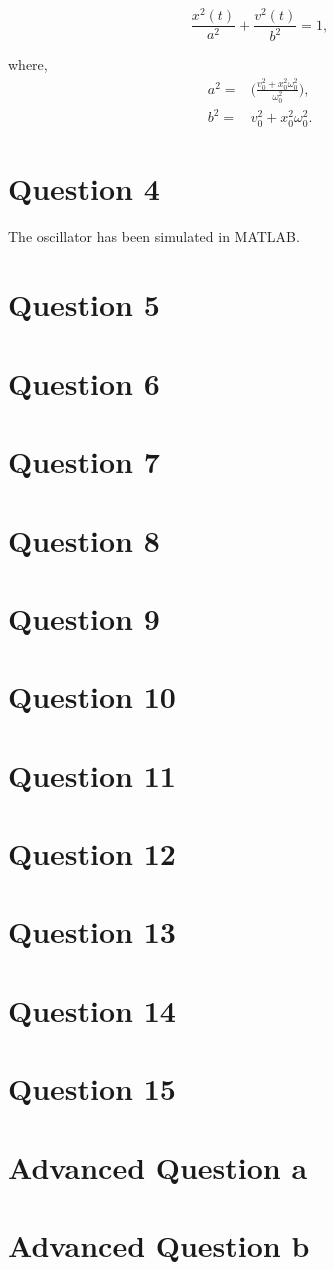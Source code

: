 \documentclass[10pt]{article}
\begin{document}
\begin{equation}
\frac{x^2(t)}{a^2} + \frac{v^2(t)}{b^2} = 1,
\end{equation}

where,
\begin{align*}
a^2 =& \Big(\frac{v_{0}^2 + x_{0}^2 \omega_{0}^2}{\omega_{0}^2}\Big),\\
b^2 =& v_{0}^2 + x_{0}^2 \omega_{0}^2.
\end{align*}

\section*{Question 4}
The oscillator has been simulated in MATLAB.

\section*{Question 5}


\section*{Question 6}

\section*{Question 7}

\section*{Question 8}

\section*{Question 9}

\section*{Question 10}

\section*{Question 11}

\section*{Question 12}

\section*{Question 13}

\section*{Question 14}

\section*{Question 15}

\section*{Advanced Question a}

\section*{Advanced Question b}
\end{document}
